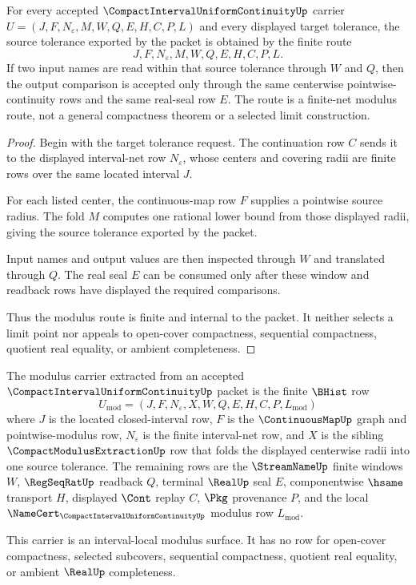 \begin{theorem}
\label{thm:compact-interval-uniform-continuity-finite-net-modulus}
For every accepted $\CompactIntervalUniformContinuityUp$ carrier
$U=(J,F,N_\varepsilon,M,W,Q,E,H,C,P,L)$ and every displayed target tolerance,
the source tolerance exported by the packet is obtained by the finite route
$$
J,F,N_\varepsilon,M,W,Q,E,H,C,P,L .
$$
If two input names are read within that source tolerance through $W$ and $Q$,
then the output comparison is accepted only through the same centerwise
pointwise-continuity rows and the same real-seal row $E$. The route is a
finite-net modulus route, not a general compactness theorem or a selected
limit construction.
\end{theorem}
\begin{proof}
Begin with the target tolerance request. The continuation row $C$ sends it to
the displayed interval-net row $N_\varepsilon$, whose centers and covering
radii are finite rows over the same located interval $J$.

For each listed center, the continuous-map row $F$ supplies a pointwise source
radius. The fold $M$ computes one rational lower bound from those displayed
radii, giving the source tolerance exported by the packet.

Input names and output values are then inspected through $W$ and translated
through $Q$. The real seal $E$ can be consumed only after these window and
readback rows have displayed the required comparisons.

Thus the modulus route is finite and internal to the packet. It neither
selects a limit point nor appeals to open-cover compactness, sequential
compactness, quotient real equality, or ambient completeness.
\end{proof}

\begin{definition}
\label{def:compact-interval-uniform-continuity-modulus-carrier}
The modulus carrier extracted from an accepted
$\CompactIntervalUniformContinuityUp$ packet is the finite $\BHist$ row
$$
U_{\mathrm{mod}}=(J,F,N_\varepsilon,X,W,Q,E,H,C,P,L_{\mathrm{mod}})
$$
where $J$ is the located closed-interval row, $F$ is the
$\ContinuousMapUp$ graph and pointwise-modulus row, $N_\varepsilon$ is the
finite interval-net row, and $X$ is the sibling
$\CompactModulusExtractionUp$ row that folds the displayed centerwise radii
into one source tolerance. The remaining rows are the $\StreamNameUp$ finite
windows $W$, $\RegSeqRatUp$ readback $Q$, terminal $\RealUp$ seal $E$,
componentwise $\hsame$ transport $H$, displayed $\Cont$ replay $C$, $\Pkg$
provenance $P$, and the local
$\NameCert_{\CompactIntervalUniformContinuityUp}$ modulus row
$L_{\mathrm{mod}}$.

This carrier is an interval-local modulus surface. It has no row for
open-cover compactness, selected subcovers, sequential compactness, quotient
real equality, or ambient $\RealUp$ completeness.
\end{definition}


